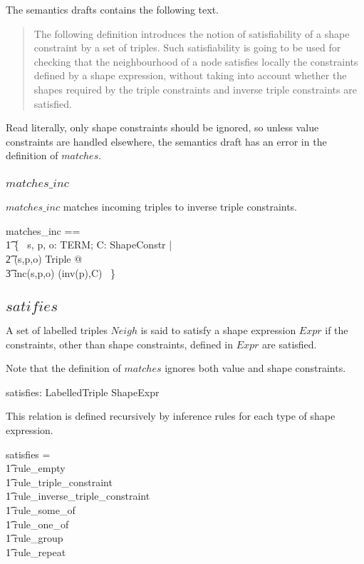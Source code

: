 \documentclass{article}
\begin{document}
The semantics drafts contains the following text.
\begin{quote}
The following definition introduces the notion of satisfiability of a shape constraint by a set of triples. Such satisfiability is going to be used for checking that the neighbourhood of a node satisfies locally the constraints defined by a shape expression, without taking into account whether the shapes required by the triple constraints and inverse triple constraints are satisfied.
\end{quote}

Read literally, only shape constraints should be ignored, so unless value constraints are handled elsewhere, 
the semantics draft has an error in the definition of $matches$.

\subsubsection{$matches\_inc$}
$matches\_inc$ matches incoming triples to inverse triple constraints.
\begin{zed}
	matches\_inc == \\
\t1		\{~ s, p, o: TERM; C: ShapeConstr | \\
\t2			(s,p,o) \in Triple @ \\
\t3				inc(s,p,o) \mapsto (inv(p),C) ~\} 
\end{zed}

\subsection{$satifies$}
A set of labelled triples $Neigh$ is said to satisfy a shape expression $Expr$ if the constraints, other than shape constraints,
defined in $Expr$ are satisfied.

Note that the definition of $matches$ ignores both value and shape constraints.

\begin{axdef}
	satisfies: \finset LabelledTriple \rel ShapeExpr
\end{axdef}

This relation is defined recursively by inference rules for each type of shape expression.
\begin{zed}
	satisfies = \\
\t1		rule\_empty \cup \\
\t1		rule\_triple\_constraint \cup \\
\t1		rule\_inverse\_triple\_constraint \cup \\
\t1		rule\_some\_of \cup \\
\t1		rule\_one\_of \cup \\
\t1		rule\_group \cup \\
\t1		rule\_repeat
\end{zed}
\end{document}

